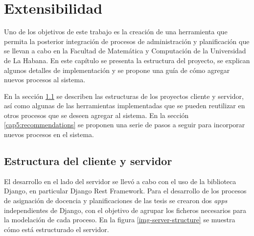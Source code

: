 \chapter{Extensibilidad}\label{chapter:extensibility}
Uno de los objetivos de este trabajo es la creación de una herramienta que 
permita la posterior integración de procesos de administración y planificación 
que se llevan a cabo en la Facultad de Matemática y Computación de la Universidad
de La Habana. 
En este capítulo
se presenta la estructura del proyecto, se explican algunos detalles de implementación y 
se propone una guía de cómo agregar nuevos 
procesos al sistema.

En la sección \ref{cap5:structure} se describen las estructuras de los proyectos cliente y 
servidor, así como algunas de las herramientas implementadas que se pueden 
reutilizar en otros procesos que se deseen agregar al sistema.
En la sección \ref{cap5:recommendations} se proponen una serie de pasos 
a seguir para incorporar nuevos procesos en el sistema.

\section{Estructura del cliente y servidor}\label{cap5:structure}
El desarrollo en el lado del servidor se llevó a cabo con el  
uso de la biblioteca Django, en particular Django Rest Framework.
Para el desarrollo de los procesos de asignación de docencia y planificaciones de las 
tesis se crearon dos \textit{apps} independientes de Django, con el objetivo de agrupar los ficheros 
necesarios para la modelación de cada proceso. 
En la figura \ref{img-server-structure} se muestra cómo está estructurado el servidor.










